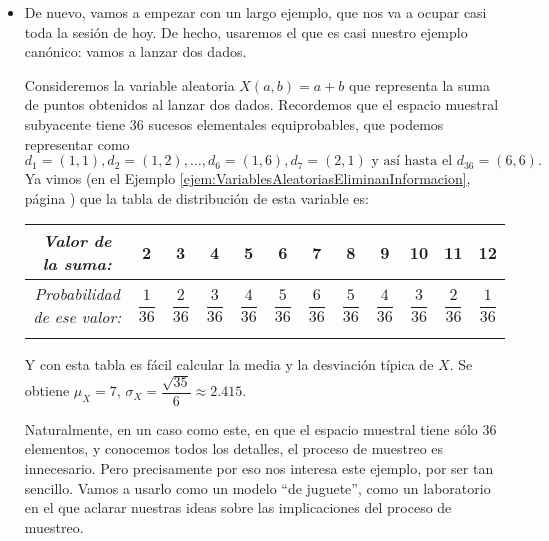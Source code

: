 \begin{itemize}
        \item De nuevo, vamos a empezar con un largo ejemplo, que nos va a ocupar casi toda la sesión de hoy. De hecho, usaremos el que es casi nuestro ejemplo canónico: vamos a lanzar dos dados.
        \begin{ejemplo}\label{ejem:DistribucionMediaMuestral}
        Consideremos la variable aleatoria $X(a,b)=a+b$ que representa la suma de puntos obtenidos al lanzar dos dados. Recordemos que el espacio muestral subyacente tiene 36 sucesos elementales equiprobables, que podemos representar como
        \[d_1=(1,1), d_2=(1,2),\ldots,d_6=(1,6),d_7=(2,1)\mbox{ y así hasta el }d_{36}=(6,6).\]
        Ya vimos (en el Ejemplo \ref{ejem:VariablesAleatoriasEliminanInformacion}, página \pageref{ejem:VariablesAleatoriasEliminanInformacion}) que la tabla de distribución de esta variable es:
        \begin{center}
            \begin{tabular}[t]{|c|c|c|c|c|c|c|c|c|c|c|c|}
                \hline
                \rule{0cm}{0.5cm}{\em Valor de la suma:}&2&3&4&5&6&7&8&9&10&11&12\\
                \hline
                \rule{0cm}{0.7cm}{\em Probabilidad de ese valor:}&$\dfrac{1}{36}$&$\dfrac{2}{36}$&$\dfrac{3}{36}$&$\dfrac{4}{36}$&$\dfrac{5}{36}$&$\dfrac{6}{36}$&$\dfrac{5}{36}$&$\dfrac{4}{36}$&$\dfrac{3}{36}$&$\dfrac{2}{36}$&$\dfrac{1}{36}$\\
                &&&&&&&&&&&\\
            \hline
            \end{tabular}
        \end{center}
        Y con esta tabla es fácil calcular la media y la desviación típica de $X$. Se obtiene $\mu_X=7$,  $\sigma_X=\dfrac{\sqrt{35}}{6}\approx 2.415$.

        Naturalmente, en un caso como este, en que el espacio muestral tiene sólo 36 elementos, y conocemos todos los detalles, el proceso de muestreo es innecesario. Pero precisamente por eso nos interesa este ejemplo, por ser tan sencillo. Vamos a usarlo como un modelo  ``de juguete'', como un laboratorio en el que aclarar nuestras ideas sobre las implicaciones del proceso de muestreo.


\end{ejemplo}
\end{itemize}
